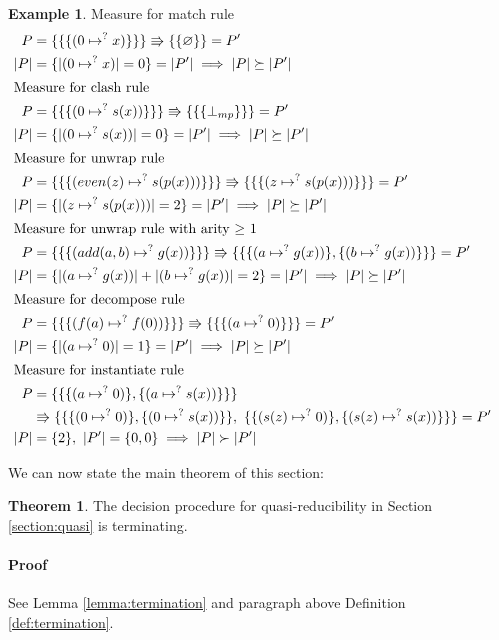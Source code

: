 \documentclass{report}
\theoremstyle{definition}
\newtheorem{theorem_inner}{Theorem}
\newenvironment{theorem}
  {\begin{customblock}\begin{theorem_inner}}
  {\end{theorem_inner}\end{customblock}}
\newtheorem{example_inner}{Example}
\newenvironment{example}
  {\begin{customblock}\begin{example_inner}}
  {\end{example_inner}\end{customblock}}
\begin{document}
\begin{example}
Measure for match rule
\begin{align*}
    P &= \{\{\{(0 \mapsto^? x)\}\}\} \Rrightarrow \{\{\varnothing\}\} = P' & \\
    \lvert P \rvert &= \{\lvert (0 \mapsto^? x) \rvert = 0\} = \lvert P' \rvert \implies \lvert P \rvert \succeq \lvert P' \rvert \\
    \intertext{Measure for clash rule}
    P &= \{\{\{(0 \mapsto^? s(x))\}\}\} \Rrightarrow \{\{\{\bot_{mp}\}\}\} = P' & \\
    \lvert P \rvert &= \{\lvert (0 \mapsto^? s(x)) \rvert = 0\} = \lvert P' \rvert \implies \lvert P \rvert \succeq \lvert P' \rvert \\
    \intertext{Measure for unwrap rule}
    P &= \{\{\{(even(z) \mapsto^? s(p(x)))\}\}\} \Rrightarrow \{\{\{(z \mapsto^? s(p(x)))\}\}\} = P' & \\
    \lvert P \rvert &= \{\lvert (z \mapsto^? s(p(x))) \rvert = 2\} = \lvert P' \rvert \implies \lvert P \rvert \succeq \lvert P' \rvert \\
    \intertext{Measure for unwrap rule with arity $\geq$ 1}
    P &= \{\{\{(add(a, b) \mapsto^? g(x))\}\}\} \Rrightarrow \{\{\{(a \mapsto^? g(x))\}, \{(b \mapsto^? g(x))\}\}\} = P' & \\
    \lvert P \rvert &= \{\lvert (a \mapsto^? g(x)) \rvert + \lvert (b \mapsto^? g(x)) \rvert = 2\} = \lvert P' \rvert \implies \lvert P \rvert \succeq \lvert P' \rvert \\
    \intertext{Measure for decompose rule}
    P &= \{\{\{(f(a) \mapsto^? f(0))\}\}\} \Rrightarrow \{\{\{(a \mapsto^? 0)\}\}\} = P' & \\
    \lvert P \rvert &= \{ \lvert (a \mapsto^? 0) \rvert = 1\} =  \lvert P' \rvert \implies \lvert P \rvert \succeq \lvert P' \rvert\\
    \intertext{Measure for instantiate rule}
    P &= \{\{\{(a \mapsto^? 0)\}, \{(a \mapsto^? s(x))\}\}\} & \\
    &\Rrightarrow \{\{\{(0 \mapsto^? 0)\}, \{(0 \mapsto^? s(x))\}\},\ \{\{(s(z) \mapsto^? 0)\}, \{(s(z) \mapsto^? s(x))\}\}\} = P' & \\
    \lvert P \rvert &= \{2\},\ \lvert P' \rvert = \{0, 0\} \implies \lvert P \rvert \succ \lvert P' \rvert
\end{align*}
\end{example}

We can now state the main theorem of this section:

\begin{theorem}\label{theorem:termination}
    The decision procedure for quasi-reducibility in Section \ref{section:quasi} is terminating.

    \paragraph{Proof} See Lemma \ref{lemma:termination} and paragraph above Definition \ref{def:termination}.
\end{theorem}
\end{document}
